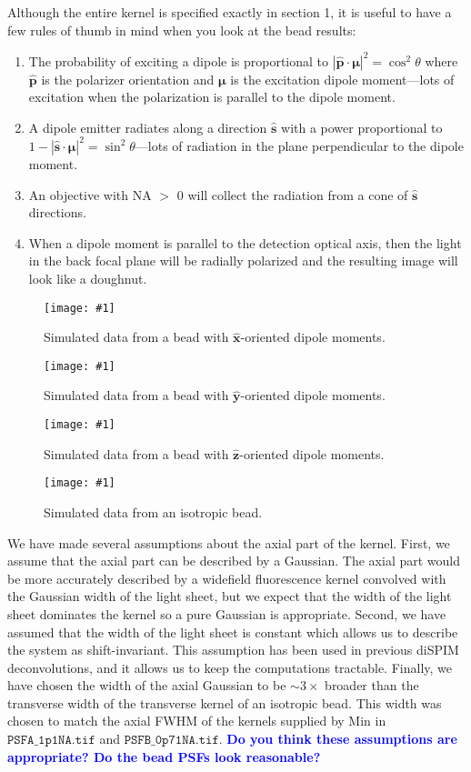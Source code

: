\documentclass[11pt]{article}
\providecommand{\mh}[1]{\mathbf{\hat{#1}}}
\providecommand{\bs}[1]{\boldsymbol{#1}}
\providecommand{\ttt}[1]{\texttt{#1}}
\providecommand{\fig}[4]{
\begin{figure}[H]
 \captionsetup{width=1.0\linewidth}
 \centering
 \texttt{[image: \#1]}
 \caption{#3}
 \label{fig:#4}
\end{figure}
}
\begin{document}
Although the entire kernel is specified exactly in section 1, it is useful to
have a few rules of thumb in mind when you look at the bead results:
\begin{enumerate}
\item The probability of exciting a dipole is proportional to
  $|\mh{p}\cdot\bs{\mu}|^2 = \cos^2\theta$ where $\mh{p}$ is the polarizer
  orientation and $\bs{\mu}$ is the excitation dipole moment---lots of
  excitation when the polarization is parallel to the dipole moment.
\item A dipole emitter radiates along a direction $\mh{s}$ with a power
  proportional to $1 - |\mh{s}\cdot\bs{\mu}|^2 = \sin^2\theta$---lots of
  radiation in the plane perpendicular to the dipole moment.
\item An objective with NA $>$ 0 will collect the radiation from a cone of
  $\mh{s}$ directions.
\item When a dipole moment is parallel to the detection optical axis, then the
  light in the back focal plane will be radially polarized and the resulting
  image will look like a doughnut.
\end{enumerate}

\fig{../figures/beads/data0.pdf}{1.0}{Simulated data from a bead with $\mh{x}$-oriented
  dipole moments.}{beadx}
\fig{../figures/beads/data1.pdf}{1.0}{Simulated data from a bead with
  $\mh{y}$-oriented dipole moments.}{}
\fig{../figures/beads/data2.pdf}{1.0}{Simulated
  data from a bead with $\mh{z}$-oriented dipole moments.}{bead4}
\fig{../figures/beads/data3.pdf}{1.0}{Simulated data from an isotropic bead.}{beadiso}

We have made several assumptions about the axial part of the kernel. First, we
assume that the axial part can be described by a Gaussian. The axial part would
be more accurately described by a widefield fluorescence kernel convolved with
the Gaussian width of the light sheet, but we expect that the width of the light
sheet dominates the kernel so a pure Gaussian is appropriate. Second, we have
assumed that the width of the light sheet is constant which allows us to
describe the system as shift-invariant. This assumption has been used in
previous diSPIM deconvolutions, and it allows us to keep the computations
tractable. Finally, we have chosen the width of the axial Gaussian to be
$\sim 3\times$ broader than the transverse width of the transverse kernel of an
isotropic bead. This width was chosen to match the axial FWHM of the kernels
supplied by Min in $\ttt{PSFA\_1p1NA.tif}$ and $\ttt{PSFB\_0p71NA.tif}$.
\textcolor{blue}{\textbf{Do you think these assumptions are appropriate? Do the
    bead PSFs look reasonable?}}
\end{document}
